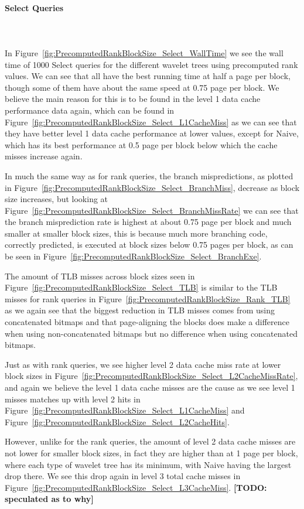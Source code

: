 \paragraph{Select Queries}~\\\\
In Figure~\ref{fig:PrecomputedRankBlockSize_Select_WallTime} we see the wall time of 1000 Select queries for the different wavelet trees using precomputed rank values.
We can see that all have the best running time at half a page per block, though some of them have about the same speed at 0.75 page per block.
We believe the main reason for this is to be found in the level 1 data cache performance data again, which can be found in Figure~\ref{fig:PrecomputedRankBlockSize_Select_L1CacheMiss} as we can see that they have better level 1 data cache performance at lower values, except for Naive, which has its best performance at 0.5 page per block below which the cache misses increase again.

In much the same way as for rank queries, the branch mispredictions, as plotted in Figure~\ref{fig:PrecomputedRankBlockSize_Select_BranchMiss}, decrease as block size increases, but looking at Figure~\ref{fig:PrecomputedRankBlockSize_Select_BranchMissRate} we can see that the branch misprediction rate is highest at about 0.75 page per block and much smaller at smaller block sizes, this is because much more branching code, correctly predicted, is executed at block sizes below 0.75 pages per block, as can be seen in Figure~\ref{fig:PrecomputedRankBlockSize_Select_BranchExe}.

The amount of TLB misses across block sizes seen in Figure~\ref{fig:PrecomputedRankBlockSize_Select_TLB} is similar to the TLB misses for rank queries in Figure~\ref{fig:PrecomputedRankBlockSize_Rank_TLB} as we again see that the biggest reduction in TLB misses comes from using concatenated bitmaps and that page-aligning the blocks does make a difference when using non-concatenated bitmaps but no difference when using concatenated bitmaps.

Just as with rank queries, we see higher level 2 data cache miss rate at lower block sizes in Figure~\ref{fig:PrecomputedRankBlockSize_Select_L2CacheMissRate}, and again we believe the level 1 data cache misses are the cause as we see level 1 misses matches up with level 2 hits in Figure~\ref{fig:PrecomputedRankBlockSize_Select_L1CacheMiss} and Figure~\ref{fig:PrecomputedRankBlockSize_Select_L2CacheHits}.

However, unlike for the rank queries, the amount of level 2 data cache misses are not lower for smaller block sizes, in fact they are higher than at 1 page per block, where each type of wavelet tree has its minimum, with Naive having the largest drop there.
We see this drop again in level 3 total cache misses in Figure~\ref{fig:PrecomputedRankBlockSize_Select_L3CacheMiss}.
\textbf{[TODO: speculated as to why]}

